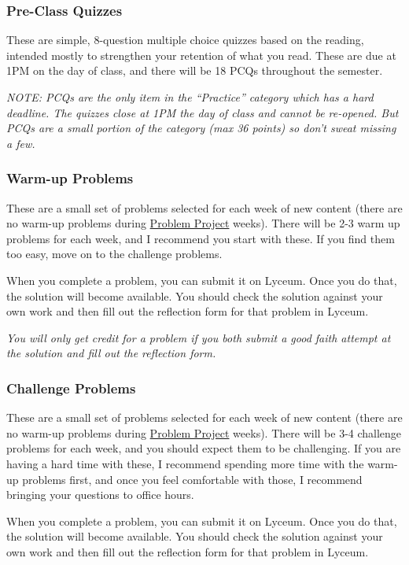 \documentclass[
  letterpaper,
  DIV=11,
  numbers=noendperiod]{scrartcl}
\begin{document}
\subsubsection{Pre-Class Quizzes}

These are simple, 8-question multiple choice quizzes based on the
reading, intended mostly to strengthen your retention of what you read.
These are due at 1PM on the day of class, and there will be 18 PCQs
throughout the semester.

\emph{NOTE: PCQs are the only item in the ``Practice'' category which
has a hard deadline. The quizzes close at 1PM the day of class and
cannot be re-opened. But PCQs are a small portion of the category (max
36 points) so don't sweat missing a few.}

\subsubsection{Warm-up Problems}

These are a small set of problems selected for each week of new content
(there are no warm-up problems during \hyperref[problemproject]{Problem
Project} weeks). There will be 2-3 warm up problems for each week, and I
recommend you start with these. If you find them too easy, move on to
the challenge problems.

When you complete a problem, you can submit it on Lyceum. Once you do
that, the solution will become available. You should check the solution
against your own work and then fill out the reflection form for that
problem in Lyceum.

\emph{You will only get credit for a problem if you both submit a good
faith attempt at the solution and fill out the reflection form.}

\subsubsection{Challenge Problems}

These are a small set of problems selected for each week of new content
(there are no warm-up problems during \hyperref[problemproject]{Problem
Project} weeks). There will be 3-4 challenge problems for each week, and
you should expect them to be challenging. If you are having a hard time
with these, I recommend spending more time with the warm-up problems
first, and once you feel comfortable with those, I recommend bringing
your questions to office hours.

When you complete a problem, you can submit it on Lyceum. Once you do
that, the solution will become available. You should check the solution
against your own work and then fill out the reflection form for that
problem in Lyceum.
\end{document}
